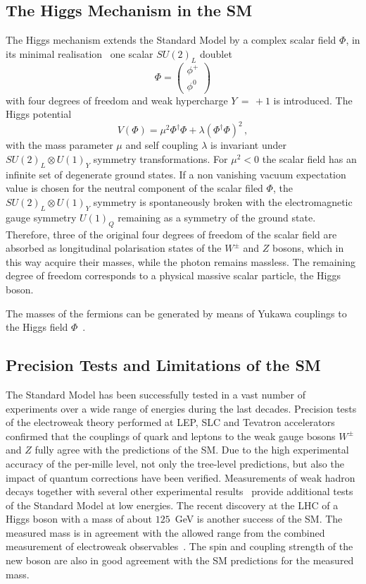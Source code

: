 \subsection{The Higgs Mechanism in the SM}
The Higgs mechanism extends the Standard Model by a complex scalar field $\Phi$, in its minimal realisation~\cite{ENGLERT,HIGGS,HIGGS2,HIGGS3,kibble}
one scalar $SU(2)_L$ doublet 
\begin{equation}
\Phi = \begin{pmatrix} \phi^+ \\ \phi^0 \end{pmatrix} 
\end{equation}
with four degrees of freedom and weak hypercharge $Y\, = \,+1$ is introduced. The Higgs potential
\begin{equation}
V(\Phi) = \mu^2\Phi^\dagger\Phi +\lambda(\Phi^\dagger\Phi)^2 \,,
\end{equation} 
with the mass parameter $\mu$ and self coupling $\lambda$ is invariant under $SU(2)_L \otimes U(1)_Y$ symmetry transformations.
For $\mu^2 <0$  the scalar field has an infinite set of degenerate ground states.  If a non vanishing vacuum expectation value is chosen
for the neutral component of the scalar filed $\Phi$, the  $SU(2)_L \otimes U(1)_Y$ symmetry is spontaneously broken with the electromagnetic gauge symmetry
$U(1)_Q$ remaining as a symmetry of the ground state. Therefore, three of the original four degrees of freedom 
of the scalar field are absorbed as longitudinal polarisation states of the $W^{\pm}$ and $Z$ bosons, which in this way acquire their 
masses, while the photon remains massless. The remaining degree of freedom corresponds to a physical massive scalar particle, the Higgs boson.

The masses of the fermions can be generated by means of Yukawa couplings to the Higgs field $\Phi$~\cite{yukawa}.


\subsection{Precision Tests and Limitations of the SM}

The Standard Model has been successfully tested in a vast number of experiments over a wide range of energies during the last decades.
Precision tests of the electroweak theory performed at LEP, SLC and Tevatron accelerators~\cite{smtest}  
confirmed that the couplings of quark and leptons to the weak gauge bosons $W^{\pm}$  and $Z$ fully agree 
with the predictions of the SM. Due to the high experimental accuracy of the per-mille level, not only the tree-level
predictions, but also the impact of quantum corrections have been verified. 
Measurements of weak hadron decays together with several other experimental results~\cite{pdg}
provide additional tests of the Standard Model at low energies. 
The recent discovery at the LHC of a Higgs boson   with a mass of about $125$~GeV \cite{AHiggsO,CHiggsO} 
is another success of the SM. The measured mass is in agreement with the allowed range from the combined measurement 
of electroweak observables~\cite{gfitter}. The spin and coupling strength of the new boson are also 
in good agreement with the SM predictions for the measured mass.

